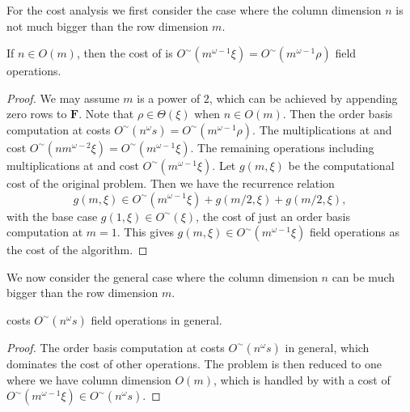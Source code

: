 For the cost analysis we first consider the case where the column
dimension $n$ is not much bigger than the row dimension $m$. 
\begin{thm}
\label{thm:costLowColDimension}If $n\in O\left(m\right)$, then the
cost of  is $O^{\sim}\left(m^{\omega-1}\xi\right)=O^{\sim}\left(m^{\omega-1}\rho\right)$
field operations.%
\begin{comment}
to compute a $\vec{s}$-minimal kernel basis of $\mathbf{F}$. 
\end{comment}
\end{thm}
\begin{proof}
We may assume $m$ is a power of $2$, which can be achieved by appending
zero rows to $\mathbf{F}$. Note that $\rho\in\Theta\left(\xi\right)$
when $n\in O\left(m\right)$. Then the order basis computation at
 costs $O^{\sim}\left(n^{\omega}s\right)=O^{\sim}\left(m^{\omega-1}\rho\right)$.
The multiplications at  and 
cost $O^{\sim}\left(nm^{\omega-2}\xi\right)=O^{\sim}\left(m^{\omega-1}\xi\right)$.
The remaining operations including multiplications at 
and  cost $O^{\sim}\left(m^{\omega-1}\xi\right)$.
Let $g(m,\xi)$ be the computational cost of the original problem.
Then we have the recurrence relation 
\[
g(m,\xi)\in O^{\sim}(m^{\omega-1}\xi)+g(m/2,\xi)+g(m/2,\xi),
\]
 with the base case $g(1,\xi)\in O^{\sim}\left(\xi\right)$, the cost
of just an order basis computation at $m=1.$ This gives $g(m,\xi)\in O^{\sim}(m^{\omega-1}\xi)$
field operations as the cost of the algorithm. 
\end{proof}
We now consider the general case where the column dimension $n$ can
be much bigger than the row dimension $m$. 
\begin{thm}
\label{thm:costGeneral}
costs $O^{\sim}\left(n^{\omega}s\right)$ field operations in general.\end{thm}
\begin{proof}
The order basis computation at  costs
$O^{\sim}\left(n^{\omega}s\right)$ in general, which dominates the
cost of other operations. The problem is then reduced to one where
we have column dimension $O\left(m\right)$, which is handled by 
with a cost of $O^{\sim}\left(m^{\omega-1}\xi\right)\in O^{\sim}\left(n^{\omega}s\right)$. 
\end{proof}
